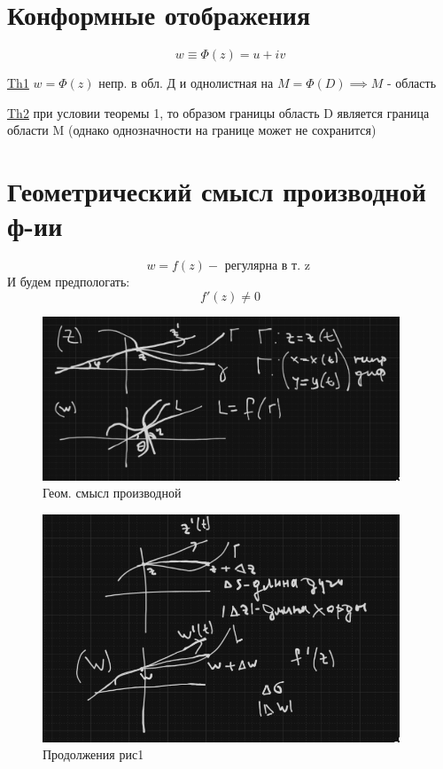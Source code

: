 \documentclass[a4paper]{article}
\begin{document}
\section*{\centering Конформные отображения}

\[
    w \equiv \Phi(z) = u + iv
\]
\begin{tcolorbox}
    \underline{Th1} $ w = \Phi(z)  $ непр. в обл. Д и однолистная на $ M = \Phi(D) \implies
    M$ - область

    \underline{Th2} при условии теоремы 1, то образом границы область D является
    граница области M (однако однозначности на границе может не сохранится) 

\end{tcolorbox}

\section*{\centering Геометрический смысл производной ф-ии}

\[
    w = f(z) - \text{ регулярна в т. z }
\]
И будем предпологать:
\[
    f'(z) \neq 0
\]

\begin{figure}[h!]
    \centering
    \includegraphics[width=0.95\textwidth]{tfpc-1-10-pic1.png}
    \caption{Геом. смысл производной}
\end{figure}

\begin{figure}[h!]
    \centering
    \includegraphics[width=0.95\textwidth]{tfcp-fig1-part2.png}
    \caption{Продолжения рис1}
\end{figure}
\end{document}
